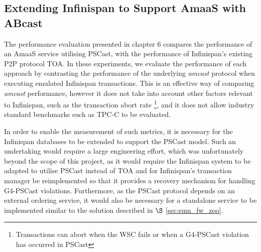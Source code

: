     \subsection{Extending Infinispan to Support AmaaS with ABcast}
    The performance evaluation presented in chapter 6 compares the performance of an \textsf{AmaaS} service utilising \textsf{PSCast}, with the performance of Infinispan's existing P2P protocol TOA.  In these experiments, we evaluate the performance of each approach by contrasting the performance of the underlying \emph{amcast} protocol when executing emulated Infinispan transactions.  This is an effective way of comparing \emph{amcast} performance, however it does not take into account other factors relevant to Infinispan, such as the transaction abort rate \footnote{Transactions can abort when the WSC fails or when a G4-PSCast violation has occurred in \textsf{PSCast}}, and it does not allow industry standard benchmarks such as TPC-C \citep{TPC-C} to be evaluated.  
    
    In order to enable the measurement of such metrics, it is necessary for the Infinispan databases to be extended to support the \textsf{PSCast} model.  Such an undertaking would require a large engineering effort, which was unfortunately beyond the scope of this project, as it would require the Infinispan system to be adapted to utilise \textsf{PSCast} instead of \textsf{TOA} and for Infinispan's transaction manager be reimplemented so that it provides a recovery mechanism for handling G4-PSCast violations.  Furthermore, as the \textsf{PSCast} protocol depends on an external ordering service, it would also be necessary for a standalone service to be implemented similar to the solution described in $\S$ \ref{sec:sum_fw_zoo}.  